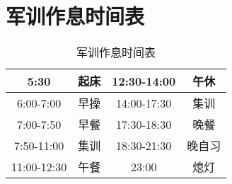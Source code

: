 \section[军训作息时间表]{军训作息时间表\footnotemark\vspace{-1em}}
\begin{table}[ht]
    \centering
    \begin{tabular}{|c|c|c|c|}
        \hline
        5:30        & 起床 & 12:30-14:00 & 午休  \\
        \hline
        6:00-7:00   & 早操 & 14:00-17:30 & 集训  \\
        \hline
        7:00-7:50   & 早餐 & 17:30-18:30 & 晚餐  \\
        \hline
        7:50-11:00  & 集训 & 18:30-21:30 & 晚自习 \\
        \hline
        11:00-12:30 & 午餐 & 23:00       & 熄灯  \\
        \hline
    \end{tabular}
    \vspace{-0.5em}
    \caption[exercise_time]{军训作息时间表}
    \vspace{-0.5em}
\end{table}
